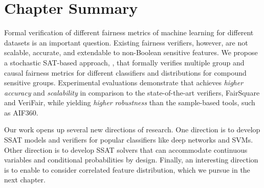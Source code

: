 \section{Chapter Summary}
Formal verification of different fairness metrics of machine learning for different datasets is an important question. Existing fairness verifiers, however, are not scalable, accurate, and extendable to non-Boolean sensitive features. We propose a stochastic SAT-based approach, {\justicia}, that formally verifies multiple group and causal fairness metrics for different classifiers and distributions for compound sensitive groups.
Experimental evaluations demonstrate that {\justicia} achieves \textit{higher accuracy} and \textit{scalability} in comparison to the state-of-the-art verifiers, FairSquare and VeriFair, while yielding \textit{higher robustness} than the sample-based tools, such as AIF360.

Our work opens up several new directions of research. One direction is to develop SSAT models and verifiers for popular classifiers like deep networks and SVMs. Other direction is to develop SSAT solvers that can accommodate continuous variables and conditional probabilities by design. Finally, an interesting direction is to enable {\justicia} to consider correlated feature distribution, which we pursue in the next chapter.

